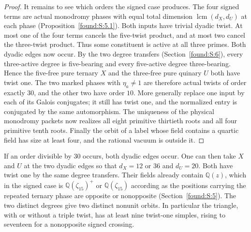 \documentclass[11pt,a4paper]{article}
\numberwithin{equation}{section}
\theoremstyle{remark}
\newcommand{\QQ}{\mathbb Q}
\newcommand{\lcm}{\operatorname{lcm}}
\begin{document}
\begin{proof}
It remains to see which orders the signed case produces. The four
signed terms are actual monodromy phases with equal total dimension $\lcm(d_X,d_U)$ at each phase (Proposition~\ref{found:S:5.1}). Both inputs have
trivial dyadic twist. At most one of the four terms cancels the
five-twist product, and at most two cancel the three-twist product.
Thus some constituent is active at all three primes. Both dyadic
edges now occur. By the two degree transfers (Section~\ref{found:S:6}), every
three-active degree is five-bearing and every five-active degree
three-bearing. Hence the five-free pure ternary $X$ and the three-free
pure quinary $U$ both have twist one. The two marked phases with
$\eta_a\ne1$ are therefore actual twists of order exactly $30$, and
the other two have order $10$. More generally replace one input by
each of its Galois conjugates; it still has twist one, and the
normalized entry is conjugated by the same automorphism. The
uniqueness of the physical monodromy packets now realizes all eight
primitive thirtieth roots and all four primitive tenth roots.
Finally the orbit of a label whose field contains a quartic field has
size at least four, and the rational vacuum is outside it.
\end{proof}

If an order divisible by $30$ occurs, both dyadic edges occur. One can
then take $X$ and $U$ at the two dyadic edges so that $d_X=12$ or
$36$ and $d_U=20$. Both have twist one by the same degree transfers.
Their fields already contain $\QQ(z)$, which in the signed case is
$\QQ(\zeta_{15})^+$ or $\QQ(\zeta_{15})$ according as the positions
carrying the repeated ternary phase are opposite or nonopposite (Section~\ref{found:S:5}). The two distinct degrees give two distinct nonunit
orbits. In particular the triangle, with or without a triple twist,
has at least nine twist-one simples, rising to seventeen for a
nonopposite signed crossing.
\end{document}
